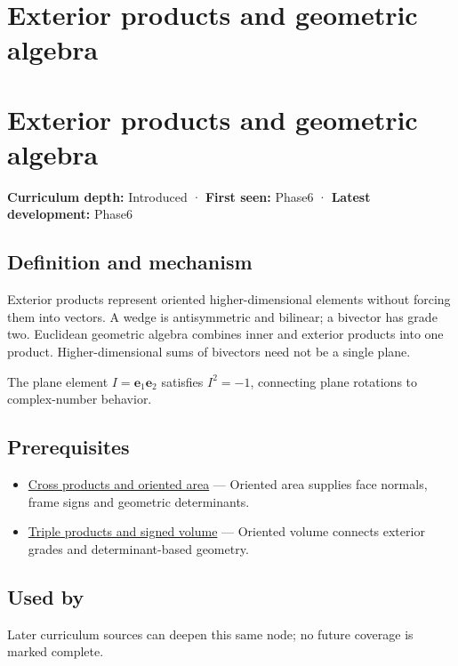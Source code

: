 \hypertarget{appendix-e1960925d1b8}{}
\section*{Exterior products and geometric algebra}
\section{Exterior products and geometric algebra}\label{exterior-products-and-geometric-algebra}

\textbf{Curriculum depth:} Introduced · \textbf{First seen:} Phase6 · \textbf{Latest development:} Phase6

\subsection{Definition and mechanism}\label{definition-and-mechanism}

Exterior products represent oriented higher-dimensional elements without forcing them into vectors. A wedge is antisymmetric and bilinear; a bivector has grade two. Euclidean geometric algebra combines inner and exterior products into one product. Higher-dimensional sums of bivectors need not be a single plane.

The plane element \(I=\mathbf e_1\mathbf e_2\) satisfies \(I^2=-1\), connecting plane rotations to complex-number behavior.

\subsection{Prerequisites}\label{prerequisites}

\begin{itemize}
\tightlist
\item
  \hyperref[appendix-2391db8052b1]{Cross products and oriented area} --- Oriented area supplies face normals, frame signs and geometric determinants.
\item
  \hyperref[appendix-5caa058bd9c7]{Triple products and signed volume} --- Oriented volume connects exterior grades and determinant-based geometry.
\end{itemize}

\subsection{Used by}\label{used-by}

Later curriculum sources can deepen this same node; no future coverage is marked complete.

